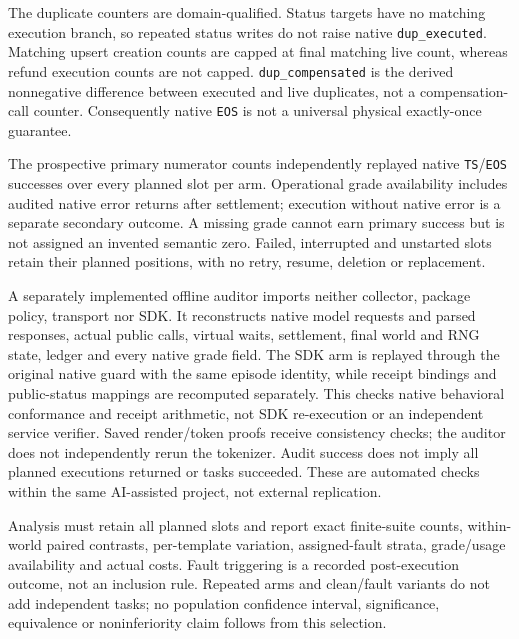The duplicate counters are domain-qualified. Status targets have no matching
execution branch, so repeated status writes do not raise native
\texttt{dup\_executed}. Matching upsert creation counts are capped at final
matching live count, whereas refund execution counts are not capped.
\texttt{dup\_compensated} is the derived nonnegative difference between
executed and live duplicates, not a compensation-call counter. Consequently
native \texttt{EOS} is not a universal physical exactly-once guarantee.

The prospective primary numerator counts independently replayed native
\texttt{TS}/\texttt{EOS} successes over every planned slot per arm. Operational
grade availability includes audited native error returns after settlement;
execution without native error is a separate secondary outcome. A missing grade
cannot earn primary success but is not assigned an invented semantic zero.
Failed, interrupted and unstarted slots retain their planned positions, with
no retry, resume, deletion or replacement.

A separately implemented offline auditor imports neither collector, package
policy, transport nor SDK. It reconstructs native model requests and parsed
responses, actual public calls, virtual waits, settlement, final world and RNG
state, ledger and every native grade field. The SDK arm is replayed through the
original native guard with the same episode identity, while receipt bindings
and public-status mappings are recomputed separately. This checks native
behavioral conformance and receipt arithmetic, not SDK re-execution or an
independent service verifier. Saved render/token proofs receive consistency
checks; the auditor does not independently rerun the tokenizer. Audit success
does not imply all planned executions returned or tasks succeeded. These are
automated checks within the same AI-assisted project, not external replication.

Analysis must retain all planned slots and report exact finite-suite counts,
within-world paired contrasts, per-template variation, assigned-fault strata,
grade/usage availability and actual costs. Fault triggering is a recorded
post-execution outcome, not an inclusion rule. Repeated arms and clean/fault
variants do not add independent tasks; no population confidence interval,
significance, equivalence or noninferiority claim follows from this selection.
